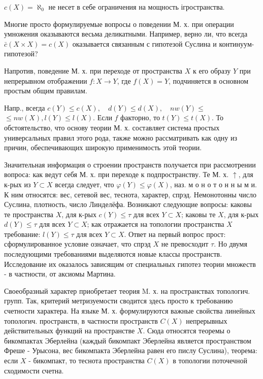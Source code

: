 \documentclass[10pt]{article}
\begin{document}
$c(X)=\aleph_{0}$ не несет в себе ограничения на мощность ігространства.



Многие просто формулируемые вопросы о поведении М. х. при операции умножения оказываются весьма деликатными. Например, верно ли, что всегда $\bar{c}(X \times X)=c(X)$ оказывается связанным с гипотезой Суслина и континуум-гипотезой?



Напротив, поведение М. х. при переходе от пространства $X$ к его образу $Y$ при непрерывном отображении $f: X \rightarrow Y$, где $f(X)=Y$, подчиняется в основном простым общим правилам.



Напр., всегда $c(Y) \leqslant c(X), \quad d(Y) \leqslant d(X), \quad n w(Y) \leqslant$ $\leqslant n w(X), l(Y) \leqslant l(X)$. Если $f$ факторно, то $t(Y) \leqslant t(X)$. То обстоятельство, что основу теории М. х. составляет система простых универсальных правил этого рода, также можно рассматривать как одну из причин, обеспечивающих широкую применимость этой теории.



Значительная информация о строении пространств получается при рассмотрении вопроса: как ведут себя М. х. при переходе к подпространству. Те М. х. $\uparrow$, для к-рых из $Y \subset X$ всегда следует, что $\varphi(Y) \leqslant \varphi(X)$, наз. м о н о т о н н ы м и. $К$ ним относятся: вес, сетевой вес, теснота, характер, спрэд. Немонотонны число Суслина, плотность, число Линделёфа. Возникают следующие вопросы: каковы те пространства $X$, для к-рых $c(Y) \leqslant \tau$ для всех $Y \subset X$; каковы те $X$, для к-рых $d(Y) \leqslant \tau$ для всех $Y \subset X$; как отражается на топологии пространства $X$ требование: $l(Y) \leqslant \tau$ для всех $Y \subset X$. Ответ на первый вопрос прост: сформулированное условие означает, что спрэд $X$ не превосходит $\tau$. Но двумя последующими требованиями выделяются новые классы пространств. Исследование их оказалось зависящим от специальных гипотез теории множеств - в частности, от аксиомы Мартина.



Своеобразный характер приобретает теория M. х. на пространствах топологич. групп. Так, критерий метризуемости сводится здесь просто к требованию счетности характера. На языке М. х. формулируются важные свойства линейных топологич. пространств, в частности пространств $C(X)$ непрерывных действительных функций на пространстве $X$. Сюда относятся теоремы о бикомпактах Эберлейна (каждый бикомпакт Эберлейна является пространством Фреше - Урысона, вес бикомпакта Эберлейна равен его пислу Суслина), теорема: если $X$ - бикомпакт, то теснота пространства $C(X)$ в топологии поточечной сходимости счетна.
\end{document}
